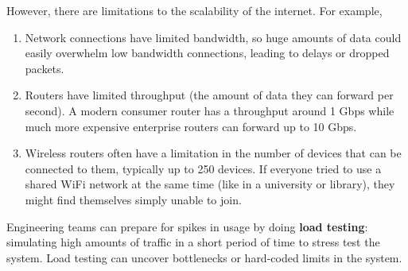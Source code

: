 \documentclass{article}
\newcounter{definition}[section]
\newcounter{example}[section]
\newcounter{code}[section]
\begin{document}
  However, there are limitations to the scalability of the internet. For example, 
  \begin{enumerate}
      \item Network connections have limited bandwidth, so huge amounts of data could easily overwhelm low bandwidth connections, leading to delays or dropped packets. 
      \item Routers have limited throughput (the amount of data they can forward per second). A modern consumer router has a throughput around 1 Gbps while much more expensive enterprise routers can forward up to 10 Gbps. 
      \item Wireless routers often have a limitation in the number of devices that can be connected to them, typically up to 250 devices. If everyone tried to use a shared WiFi network at the same time (like in a university or library), they might find themselves simply unable to join.
  \end{enumerate}

  \begin{definition}
    \label{def:load-testing}
  Engineering teams can prepare for spikes in usage by doing \textbf{load testing}: simulating high amounts of traffic in a short period of time to stress test the system. Load testing can uncover bottlenecks or hard-coded limits in the system. 
  \end{definition}
\end{document}
